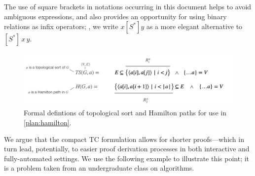 The use of square brackets in notations occurring in this document helps to avoid ambiguous expressions, and also provides an opportunity for using binary relations as infix operators;
\eg, we write $x[S^*]y$ as a more elegant alternative to $[S^*]\,x\,y$.

\begin{figure}
\centering
\includegraphics[width=.8\textwidth]{img/topological-and-hamilton.png}
\caption{Formal defintions of topological sort and Hamilton paths
  for use in \autoref{plan:hamilton}.}
\label{plan:hamilton-defs}
\end{figure}

We argue that the compact TC formulation allows for shorter proofs---which in turn lead, potentially, to easier proof derivation processes in both interactive and fully-automated settings.
We use the following example to illustrate this point; it is a problem taken from an undergraduate class on algorithms.

